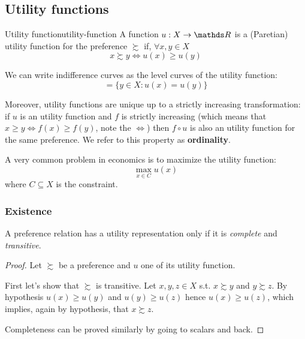 \documentclass[12pt]{extarticle}
\begin{document}
\subsection{Utility functions}

\begin{definition}{Utility function}{utility-function}
	A function $u: X \to \R$ is a (Paretian) utility function for the preference $\succsim$ if, $\forall x, y \in X$
	\begin{equation}
		x \succsim y \iff u(x) \geq u(y)
	\end{equation}
\end{definition}

We can write indifference curves as the level curves of the utility function:
\begin{equation}
	[x] = \{ y \in X : u(x) = u(y) \}
\end{equation}

Moreover, utility functions are unique up to a strictly increasing transformation:
if $u$ is an utility function and $f$ is strictly increasing
(which means that $x \geq y \iff f(x) \geq f(y)$, note the $\iff$)
then $f \circ u$ is also an utility function for the same preference.
We refer to this property as \textbf{ordinality}.

A very common problem in economics is to maximize the utility function:
\begin{equation}
	\max_{x \in C} u(x)
\end{equation}
where $C \subseteq X$ is the constraint.

\subsubsection{Existence}

\begin{proposition}{}{}
	A preference relation has a utility representation only if it is
	\emph{complete} and \emph{transitive}.
\end{proposition}

\begin{proof}
	Let $\succsim$ be a preference and $u$ one of its utility function.

	First let's show that $\succsim$ is transitive.
	Let $x, y, z \in X$ s.t. $x \succsim y$ and $y \succsim z$.
	By hypothesis $u(x) \geq u(y)$ and $u(y) \geq u(z)$ hence $u(x) \geq u(z)$,
	which implies, again by hypothesis, that $x \succsim z$.

	Completeness can be proved similarly by going to scalars and back.
\end{proof}
\end{document}
